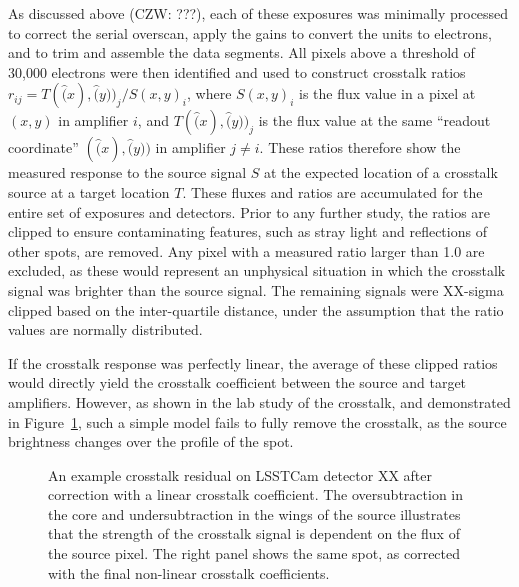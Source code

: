 As discussed above (CZW: ???), each of these exposures was minimally processed to correct the serial overscan, apply the gains to convert the units to electrons, and to trim and assemble the data segments.
All pixels above a threshold of 30,000 electrons were then identified and used to construct crosstalk ratios $r_{ij} = T(\hat(x), \hat(y))_j / S(x, y)_i$, where $S(x, y)_i$ is the flux value in a pixel at $(x, y)$ in amplifier $i$, and $T(\hat(x), \hat(y))_j$ is the flux value at the same ``readout coordinate'' $(\hat(x), \hat(y))$ in amplifier $j \ne i$.
These ratios therefore show the measured response to the source signal $S$ at the expected location of a crosstalk source at a target location $T$.
These fluxes and ratios are accumulated for the entire set of exposures and detectors.
Prior to any further study, the ratios are clipped to ensure contaminating features, such as stray light and reflections of other spots, are removed.
Any pixel with a measured ratio larger than 1.0 are excluded, as these would represent an unphysical situation in which the crosstalk signal was brighter than the source signal.
The remaining signals were XX-sigma clipped based on the inter-quartile distance, under the assumption that the ratio values are normally distributed.

If the crosstalk response was perfectly linear, the average of these clipped ratios would directly yield the crosstalk coefficient between the source and target amplifiers.
However, as shown in the lab study of the crosstalk, and demonstrated in Figure~\ref{fig:crosstalk-linear-nonlinear-fit}, such a simple model fails to fully remove the crosstalk, as the source brightness changes over the profile of the spot.

\begin{figure}[t]
    \centering
    \caption{An example crosstalk residual on LSSTCam detector XX after correction with a linear crosstalk coefficient.
      The oversubtraction in the core and undersubtraction in the wings of the source illustrates that the strength of the crosstalk signal is dependent on the flux of the source pixel.
      The right panel shows the same spot, as corrected with the final non-linear crosstalk coefficients.}
    \label{fig:crosstalk-linear-nonlinear-fit}
\end{figure}

